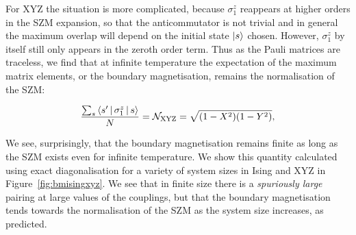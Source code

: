 \documentclass [a4paper, 11pt]{article}
\begin{document}
For XYZ the situation is more complicated, because $\sigma^z_1$ reappears at higher orders in the SZM expansion, so that the anticommutator is not trivial and in general the maximum overlap will depend on the initial state $\ket{s}$ chosen. However, $\sigma^z_1$ by itself still only appears in the zeroth order term. Thus as the Pauli matrices are traceless, we find that at infinite temperature the expectation of the maximum matrix elements, or the boundary magnetisation, remains the normalisation of the SZM:    

\begin{equation}
\label{eq:xyzbm}
\frac{\sum_s\Braket{s^\prime|\sigma_1^z|s}}{N} = \mathcal{N}_\text{XYZ} = \sqrt{(1-X^2)(1-Y^2)},
\end{equation}

We see, surprisingly, that the boundary magnetisation remains finite as long as the SZM exists even for infinite temperature. We show this quantity calculated using exact diagonalisation for a variety of system sizes in Ising and XYZ in Figure~\ref{fig:bmisingxyz}. We see that in finite size there is a \emph{spuriously large} pairing at large values of the couplings, but that the boundary magnetisation tends towards the normalisation of the SZM as the system size increases, as predicted.
\end{document}
